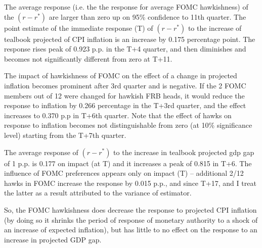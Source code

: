 \documentclass[11pt]{article}
\begin{document}
The average response (i.e. the the response for average FOMC hawkishness) of the $\left(r-r^*\right)$ are larger than zero up on 95\% confidence to 11th quarter. The point estimate of the immediate response (T) of $\left(r-r^*\right)$ to the increase of tealbook projected of CPI inflation is an increase by 0.175 percentage point. The response rises peak of 0.923 p.p. in the T+4 quarter, and then diminishes and becomes not significantly different from zero at T+11.


The impact of hawkishness of FOMC on the effect of a change in projected inflation becomes prominent after 3rd quarter and is negative. If the 2 FOMC members out of 12 were changed for hawkish FRB heads, it would reduce the response to inflation by 0.266 percentage in the T+3rd quarter, and the effect increases to 0.370 p.p in T+6th quarter. 
Note that the effect of hawks on response to inflation becomes not distinguishable from zero (at 10\% significance level) starting from the T+7th quarter.

The average response of $\left(r-r^*\right)$ to the increase in tealbook projected gdp gap of 1 p.p. is 0.177 on impact (at T) and it increases a peak of 0.815 in T+6. The influence of FOMC preferences appears only on impact (T) -- additional 2/12 hawks in FOMC increase the response by 0.015 p.p., and since T+17, and I treat the latter as a result attributed to the variance of estimator. 

So, the FOMC hawkishness does decrease the response to projected CPI inflation (by doing so it shrinks the period of response of monetary authority to a shock of an increase of expected inflation), but has little to no effect on the response to an increase in projected GDP gap.
\end{document}

